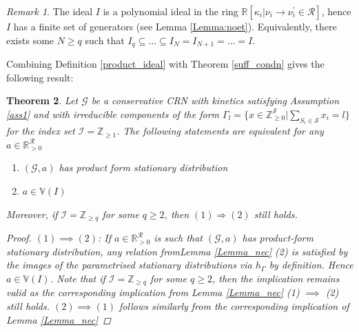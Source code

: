 \documentclass{amsart}
\newtheorem{theorem}{Theorem}[section]
\theoremstyle{definition}
\theoremstyle{remark}
\newtheorem{remark}[theorem]{Remark}
\theoremstyle{Conjecture/open problem}
\theoremstyle{assumption}
\theoremstyle{conjecture}
\newcommand{\intval}{q}
\def\Ga{\Gamma}
\def\p{^{\prime}}
\def\k{\kappa}
\def\cG{\mathcal{G}}
\def\cR{\mathcal{R}}
\def\cS{\mathcal{S}}
\def\R{\mathbb{R}}
\def\Z{\mathbb{Z}}
\numberwithin{equation}{section}
\begin{document}
	\begin{remark}
\item The ideal $I$ is  a polynomial ideal in the ring $\R[\k_i|\nu_i\to \nu_i\p\in\cR ]$, hence $I$ has a finite set of generators (see Lemma \ref{Lemma:noet}). Equivalently, there exists some $N\geq \intval$ such that $I_{\intval}\subseteq \ldots \subseteq I_N=I_{N+1}=\ldots =I$. 


\end{remark}


 Combining Definition \ref{product_ideal} with Theorem \ref{suff_condn} gives the following result:
\begin{theorem}\label{semi_alg}
 Let $\cG$ be a conservative CRN with kinetics satisfying Assumption \ref{ass1} and with irreducible components of the form
$\Ga_l=\{x\in \Z^\cS_{\geq 0}|\sum_{S_i\in \cS} x_i=l\}$ for the index set $\mathcal{I}=\Z_{\geq 1}$. The following statements are equivalent for any $a\in \R^\cR_{>0}$
\begin{enumerate}
    \item $(\cG,a)$ has product form stationary distribution
    \item $a\in \mathbb{V}(I)$
\end{enumerate}
Moreover, if $\mathcal{I}=\Z_{\geq \intval}$ for some $\intval\geq 2$, then $(1)\Rightarrow (2)$ still holds. 

\begin{proof}
$(1)\implies (2)$: If $a\in \R^\cR_{>0}$ is such that $(\cG,a)$ has product-form stationary distribution, any relation fromLemma \ref{Lemma_nec} (2) is satisfied by the images of the parametrised stationary distributions via $h_\Ga$ by definition. Hence $a\in \mathbb{V}(I)$. Note that if $\mathcal{I}=\Z_{\geq \intval}$ for some $\intval\geq 2$, then the implication remains valid as the corresponding implication from Lemma \ref{Lemma_nec} (1) $\implies $ (2) still holds.\hfill\break
$(2)\implies (1)$ follows similarly from the corresponding implication of Lemma \ref{Lemma_nec}
\end{proof}
\end{theorem}

 
\end{document}

